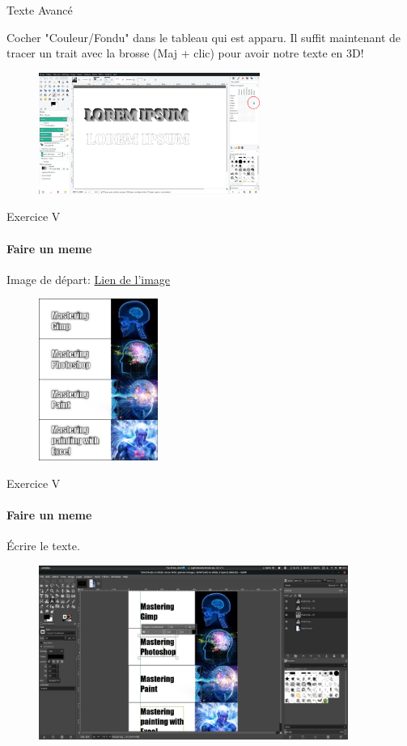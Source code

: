 \documentclass[10pt,svgnames,usenames,table]{beamer}
\begin{document}
\begin{frame}{Texte Avancé}
\begin{enumerate}
{			Cocher "Couleur/Fondu" dans le tableau qui est apparu. Il suffit maintenant de tracer un trait avec la brosse (Maj + clic) pour avoir notre texte en 3D!			
			\begin{figure}
			\centering
			\includegraphics[height=150px]{Images/text/3D4}
			\end{figure}
		}		
		\end{enumerate}
\end{frame}

\begin{frame}{Exercice V}
\framesubtitle{Faire un meme}
Image de départ: \href{http://louvainlinux.github.io/atelier-gimp/src/Images/text/meme_template.png}{Lien de l'image}
	\begin{figure}
		\centering
		\includegraphics[height=200px]{Images/text/meme}
	\end{figure}
\end{frame}

\begin{frame}{Exercice V}
\framesubtitle{Faire un meme}
	Écrire le texte.
	\begin{figure}
		\centering
		\includegraphics[width=0.90\textwidth]{Images/text/meme_txt}
	\end{figure}
\end{frame}
\end{document}
